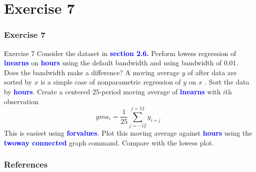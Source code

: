 \documentclass[11pt, aspectratio=169]{beamer}
\begin{document}
	\section{Exercise 7}
		\begin{frame}
			\frametitle{Exercise 7}
			\begin{block}{Exercise 7}
				Consider the dataset in \textcolor{blue}{\textbf{section 2.6.}} Perform lowess regression of
				\textcolor{blue}{\textbf{lnearns}} on \textcolor{blue}{\textbf{hours}} using the default bandwidth and using bandwidth of
				$0.01$. Does the bandwidth make a difference? A moving average $y$ of 
				after data are sorted by $x$ is a simple case of nonparametric regression
				of $y$ on $x$ . Sort the data by \textcolor{blue}{\textbf{hours}}. Create a centered $25$-period moving
				average of \textcolor{blue}{\textbf{lnearns}} with $i$th observation
					\begin{equation*}
						yma_{i} = \dfrac{1}{25} \sum\limits_{j=-12}^{j=12}y_{i+j}
					\end{equation*}
				This is easiest using \textcolor{blue}{\textbf{forvalues}}. Plot this moving average against
				\textcolor{blue}{\textbf{hours}} using the \textcolor{blue}{\textbf{twoway connected}} graph command. Compare with the
				lowess plot.
			\end{block}
		\end{frame}
	\begin{frame}[t,allowframebreaks]
		\frametitle{References}
		
		
		\nocite{cameron2022-I}
		\nocite{cameron2022-II}
	\end{frame}
	\begin{frame}
		\maketitle
	\end{frame}
\end{document}
